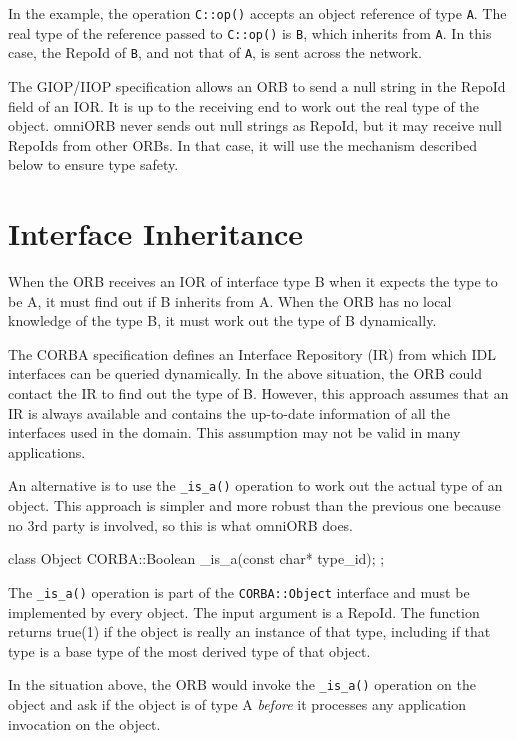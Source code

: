 \documentclass[11pt,twoside,a4paper]{book}
\newcommand{\type}[1]{\texttt{#1}}
\newcommand{\intf}[1]{\texttt{#1}}
\newcommand{\op}[1]{\texttt{#1()}}
\begin{document}
In the example, the operation \op{C::op} accepts an object reference
of type \type{A}. The real type of the reference passed to \op{C::op}
is \type{B}, which inherits from \type{A}. In this case, the RepoId of
\type{B}, and not that of \type{A}, is sent across the network.

The GIOP/IIOP specification allows an ORB to send a null string in the
RepoId field of an IOR. It is up to the receiving end to work out the
real type of the object. omniORB never sends out null strings as
RepoId, but it may receive null RepoIds from other ORBs. In that case,
it will use the mechanism described below to ensure type safety.


\section{Interface Inheritance}

When the ORB receives an IOR of interface type B when it expects the
type to be A, it must find out if B inherits from A. When the ORB has
no local knowledge of the type B, it must work out the type of B
dynamically.

The CORBA specification defines an Interface Repository (IR) from
which IDL interfaces can be queried dynamically. In the above
situation, the ORB could contact the IR to find out the type of B.
However, this approach assumes that an IR is always available and
contains the up-to-date information of all the interfaces used in the
domain. This assumption may not be valid in many applications.

An alternative is to use the \op{\_is\_a} operation to work out the
actual type of an object. This approach is simpler and more robust
than the previous one because no 3rd party is involved, so this is
what omniORB does.

\begin{cxxlisting}
class Object{
    CORBA::Boolean _is_a(const char* type_id);
};
\end{cxxlisting}

The \op{\_is\_a} operation is part of the \intf{CORBA::Object}
interface and must be implemented by every object. The input argument
is a RepoId. The function returns true(1) if the object is really an
instance of that type, including if that type is a base type of the
most derived type of that object.

In the situation above, the ORB would invoke the \op{\_is\_a}
operation on the object and ask if the object is of type A
\emph{before} it processes any application invocation on the object.
\end{document}
